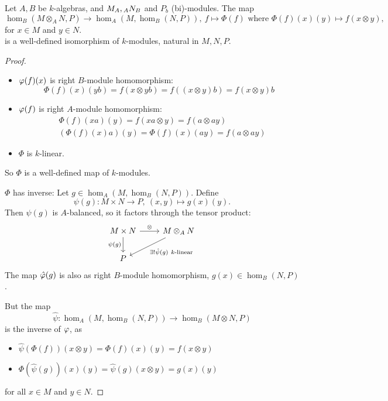 \begin{prop}
  Let $A,B$ be $k$-algebras, and $M_A,\indmodule[A]{N}[B]$ and $P_b$ (bi)-modules. The map
  \[
  \hom_B(M\otimes_AN,P)\to \hom_A\left(M,\hom_B\left(N,P\right)\right),~f\mapsto \Phi(f)\text{ where }\Phi(f)(x)(y)\mapsto f(x\otimes y),
  \]
  for $x\in M$ and $y\in N$.\\
  is a well-defined isomorphism of $k$-modules, natural in $M,N,P$.
\end{prop}
\begin{proof}
  \begin{itemize}
    \item $\varphi(f)(x)$ is right $B$-module homomorphism:
    \[
      \Phi(f)(x)(yb)=f(x\otimes yb) = f((x\otimes y)b)=f(x\otimes y)b
    \]
    \item $\varphi(f)$ is right $A$-module homomorphism:
    \begin{align*}
      &\Phi(f)(xa)(y)=f(xa\otimes y) = f(a\otimes ay)\\
      &\left(\Phi(f)(x)a\right)(y) = \Phi(f)(x)(ay) =f(a\otimes ay)
    \end{align*}
    \item $\Phi$ is $k$-linear.
  \end{itemize}
  So $\Phi$ is a well-defined map of $k$-modules.\par
  $\Phi$ has inverse: Let $g\in \hom_A(M,\hom_B(N,P))$. Define
  \[
  \psi(g):M\times N\to P,~(x,y)\mapsto g(x)(y).
  \]
  Then $\psi(g)$ is $A$-balanced, so it factors through the tensor product:
  \[
  \begin{tikzcd}
    M\times N\ar{r}{\otimes}\ar[swap]{d}{\psi(g)}&M\otimes_AN\ar{dl}{\exists!\hat{\psi}(g)~k\text{-linear}}\\
    P&
  \end{tikzcd}
  \]
  The map $\hat{\varphi}(g)$ is also as right $B$-module homomorphism, \coms $g(x)\in \hom_B(N,P)$\come.\par
  But the map
  \[
  \hat{\psi}:\hom_A(M,\hom_B(N,P))\to \hom_B(M\otimes N,P)
  \]
  is the inverse of $\varphi$, as
  \begin{itemize}
    \item $\hat{\psi}(\Phi(f))(x\otimes y)=\Phi(f)(x)(y)=f(x\otimes y)$
    \item $\Phi(\hat{\psi}(g))(x)(y)=\hat{\psi}(g)(x\otimes y)=g(x)(y)$
  \end{itemize}
  for all $x\in M$ and $y\in N$.
\end{proof}

